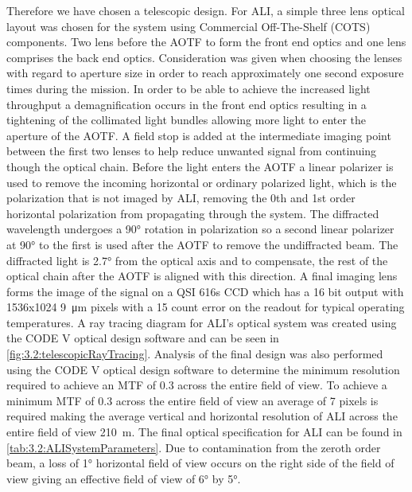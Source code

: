 \documentclass[12pt]{article}
\begin{document}
Therefore we have chosen a telescopic design. For ALI, a simple three lens optical layout was chosen for the system using Commercial Off-The-Shelf (COTS) components. Two lens 
before the AOTF to form the front end optics and one lens comprises the back end optics. Consideration was given when choosing the lenses with regard to aperture size in order 
to reach approximately one second exposure times during the mission. In order to be able to achieve the increased light throughput a demagnification occurs in the front end 
optics resulting in a tightening of the collimated light bundles allowing more light to enter the aperture of the AOTF. A field stop is added at the intermediate imaging point 
between the first two lenses to help reduce unwanted signal from continuing though the optical chain. Before the light enters the AOTF a linear polarizer is used to remove the 
incoming horizontal or ordinary polarized light, which is the polarization that is not imaged by ALI, removing the 0th and 1st order horizontal polarization from propagating 
through the system. The diffracted wavelength undergoes a 90\si{\degree} rotation in polarization so a second linear polarizer at 90\si{\degree} to the first is used after the 
AOTF to remove the undiffracted beam. The diffracted light is 2.7\si{\degree} from the optical axis and to compensate, the rest of the optical chain after the AOTF is aligned 
with this direction. A final imaging lens forms the image of the signal on a QSI 616s CCD which has a 16 bit output with 1536x1024 9~\si{\micro\metre} pixels with a 15 count 
error on the readout for typical operating temperatures. A ray tracing diagram for ALI's optical system was created using the CODE V optical design software and can be seen in 
\autoref{fig:3.2:telescopicRayTracing}. Analysis of the final design was also performed using the CODE V optical design software to determine the minimum resolution required to 
achieve an MTF of 0.3 across the entire field of view. To achieve a minimum MTF of 0.3 across the entire field of view an average of 7 pixels is required making the average 
vertical and horizontal resolution of ALI across the entire field of view 210~m. The final optical specification for ALI can be found in \autoref{tab:3.2:ALISystemParameters}. 
Due to contamination from the zeroth order beam, a loss of 1\si{\degree} horizontal field of view occurs on the right side of the field of view giving an effective field of view 
of 6\si{\degree} by 5\si{\degree}.
\end{document}
